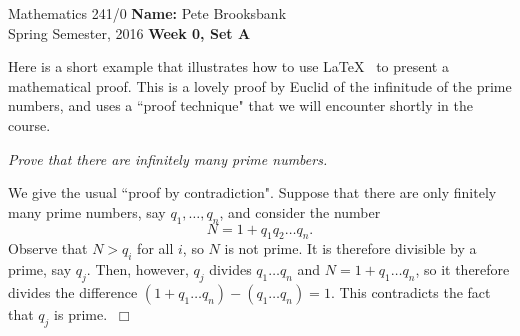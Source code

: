 \documentclass[12pt]{article}
\newcommand{\qed}{~\Box}
\begin{document}
\begin{tabbing}
Mathematics 241/0 \hspace{9cm} \= {\bf Name:} Pete Brooksbank \\
Spring Semester, 2016 \>  {\bf Week 0, Set A} 
\end{tabbing}
\vspace*{7mm}

Here is a short example that illustrates how to use \LaTeX~ to present a mathematical proof.
This is a lovely proof by Euclid of the infinitude of the prime numbers, and
uses a ``proof technique" that we will encounter shortly in the course.
\vspace*{5mm}

 {\em Prove that there are infinitely many prime numbers.}
\vspace*{3mm}

  We give the usual ``proof by contradiction".
Suppose that there are only finitely many prime numbers, say $q_1,\ldots,q_n$,
and consider the number 
\[
N=1+q_1q_2\ldots q_n.
\]
Observe that $N>q_i$ for all $i$, so $N$ is not prime. It is therefore divisible by a prime,
say $q_j$. Then, however, $q_j$ divides $q_1\ldots q_n$ and $N=1+q_1\ldots q_n$,
so it therefore divides the difference $(1+q_1\ldots q_n)-(q_1\ldots q_n)=1$.
This contradicts the fact that $q_j$ is prime.
$\qed$

\end{document}
